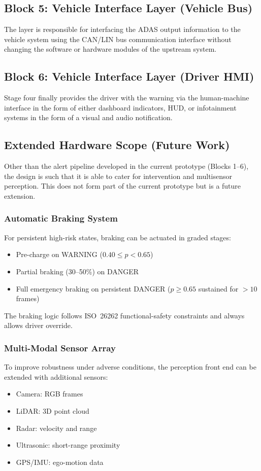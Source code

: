 \documentclass[conference]{IEEEtran}
\begin{document}
\subsection{Block 5: Vehicle Interface Layer (Vehicle Bus)}
The layer is responsible for interfacing the ADAS output information to the vehicle system using the CAN/LIN bus communication interface without changing the software or hardware modules of the upstream system.

\subsection{Block 6: Vehicle Interface Layer (Driver HMI)}
Stage four finally provides the driver with the warning via the human-machine interface in the form of either dashboard indicators, HUD, or infotainment systems in the form of a visual and audio notification.

\subsection{Extended Hardware Scope (Future Work)}
Other than the alert pipeline developed in the current prototype (Blocks 1--6), the design is such that it is able to cater for intervention and multisensor perception. This does not form part of the current prototype but is a future extension.

\subsubsection{Automatic Braking System}
For persistent high-risk states, braking can be actuated in graded stages:
\begin{itemize}
    \item Pre-charge on WARNING ($0.40 \leq p < 0.65$)
    \item Partial braking (30--50\%) on DANGER
    \item Full emergency braking on persistent DANGER ($p \geq 0.65$ sustained for $>10$ frames)
\end{itemize}
The braking logic follows ISO~26262 functional-safety constraints and always allows driver override.

\subsubsection{Multi-Modal Sensor Array}
To improve robustness under adverse conditions, the perception front end can be extended with additional sensors:
\begin{itemize}
    \item Camera: RGB frames
    \item LiDAR: 3D point cloud
    \item Radar: velocity and range
    \item Ultrasonic: short-range proximity
    \item GPS/IMU: ego-motion data
\end{itemize}
\end{document}
